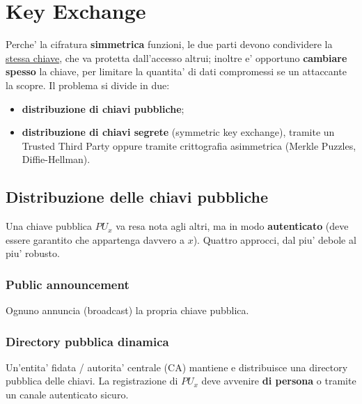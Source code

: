 % 
\chapter{Key Exchange}
Perche' la cifratura \textbf{simmetrica} funzioni, le due parti devono condividere la \underline{stessa chiave}, che va protetta dall'accesso altrui; inoltre e' opportuno \textbf{cambiare spesso} la chiave, per limitare la quantita' di dati compromessi se un attaccante la scopre. Il problema si divide in due:
\begin{itemize}
  \item \textbf{distribuzione di chiavi pubbliche};
  \item \textbf{distribuzione di chiavi segrete} (symmetric key exchange), tramite un Trusted Third Party oppure tramite crittografia asimmetrica (Merkle Puzzles, Diffie-Hellman).
\end{itemize}

\section{Distribuzione delle chiavi pubbliche}
Una chiave pubblica $ PU_x $ va resa nota agli altri, ma in modo \textbf{autenticato} (deve essere garantito che appartenga davvero a $ x $). Quattro approcci, dal piu' debole al piu' robusto.

\subsection{Public announcement}
Ognuno annuncia (broadcast) la propria chiave pubblica.

\subsection{Directory pubblica dinamica}
Un'entita' fidata / autorita' centrale (CA) mantiene e distribuisce una directory pubblica delle chiavi. La registrazione di $ PU_x $ deve avvenire \textbf{di persona} o tramite un canale autenticato sicuro.

